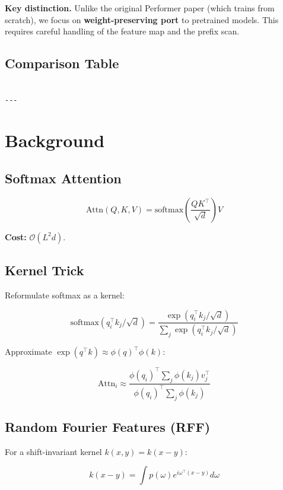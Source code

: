 \textbf{Key distinction.} Unlike the original Performer paper (which trains from 
scratch), we focus on \textbf{weight-preserving port} to pretrained models. This 
requires careful handling of the feature map and the prefix scan.



\subsection{Comparison Table}

\begin{lstlisting}

---
\end{lstlisting}


\section{Background}

\subsection{Softmax Attention}

\[
\text{Attn}(Q, K, V) = \text{softmax}\!\left(\frac{QK^\top}{\sqrt{d}}\right)V
\tag{3.1}
\]

\textbf{Cost:} $\mathcal{O}(L^2 d)$.

\subsection{Kernel Trick}

Reformulate softmax as a kernel:

\[
\text{softmax}(q_i^\top k_j / \sqrt{d}) = \frac{\exp(q_i^\top k_j / \sqrt{d})}{\sum_j \exp(q_i^\top k_j / \sqrt{d})}
\tag{3.2}
\]

Approximate $\exp(q^\top k) \approx \phi(q)^\top \phi(k)$:

\[
\text{Attn}_i \approx \frac{\phi(q_i)^\top \sum_j \phi(k_j) v_j^\top}{\phi(q_i)^\top \sum_j \phi(k_j)}
\tag{3.3}
\]

\subsection{Random Fourier Features (RFF)}

For a shift-invariant kernel $k(x, y) = k(x - y)$:

\[
k(x - y) = \int p(\omega) e^{i \omega^\top (x - y)} d\omega
\tag{3.4}
\]

